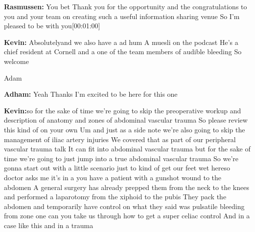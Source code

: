 \documentclass[
]{book}
\begin{document}
\textbf{Rasmussen:} You bet Thank you for the opportunity and the
congratulations to you and your team on creating such a useful
information sharing venue So I'm pleased to be with you{[}00:01:00{]}

\textbf{Kevin:} Absolutelyand we also have a ad hum A muesli on the podcast
He's a chief resident at Cornell and a one of the team members of
audible bleeding So welcome

Adam

\textbf{Adham:} Yeah Thanks I'm excited to be here for this one

\textbf{Kevin:}so for the sake of time we're going to skip the preoperative
workup and description of anatomy and zones of abdominal vascular trauma
So please review this kind of on your own Um and just as a side note
we're also going to skip the management of iliac artery injuries We
covered that as part of our peripheral vascular trauma talk It can fit
into abdominal vascular trauma but for the sake of time we're going to
just jump into a true abdominal vascular trauma So we're gonna start out
with a little scenario just to kind of get our feet wet hereso doctor
asks me it's in a you have a patient with a gunshot wound to the abdomen
A general surgery has already prepped them from the neck to the knees
and performed a laparotomy from the xiphoid to the pubis They pack the
abdomen and temporarily have control on what they said was pulsatile
bleeding from zone one can you take us through how to get a super celiac
control And in a case like this and in a trauma
\end{document}
